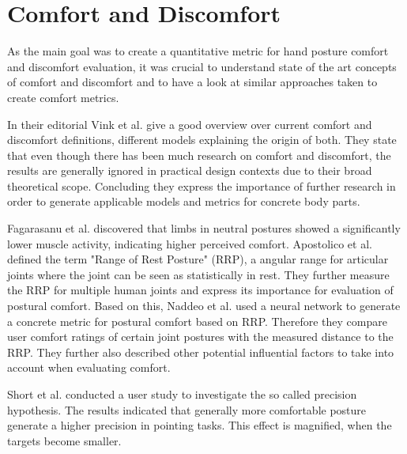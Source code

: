 \section{Comfort and Discomfort}

As the main goal was to create a quantitative metric for hand posture comfort and discomfort evaluation, it was crucial to understand state of the art concepts of comfort and discomfort and to have a look at similar approaches taken to create comfort metrics.

In their editorial Vink et al. \cite{vink2012editorial} give a good overview over current comfort and discomfort definitions, different models explaining the origin of both. They state that even though there has been much research on comfort and discomfort, the results are generally ignored in practical design contexts due to their broad theoretical scope. Concluding they express the importance of further research in order to generate applicable models and metrics for concrete body parts.

Fagarasanu et al. \cite{fagarasanu2004measurement} discovered that limbs in neutral postures showed a significantly lower muscle activity, indicating higher perceived comfort. Apostolico et al. \cite{apostolico2014postural} defined the term "Range of Rest Posture" (RRP), a angular range for articular joints where the joint can be seen as statistically in rest. They further measure the RRP for multiple human joints and express its importance for evaluation of postural comfort. Based on this, Naddeo et al. \cite{naddeo2015proposal} used a neural network to generate a concrete metric for postural comfort based on RRP. Therefore they compare user comfort ratings of certain joint postures with the measured distance to the RRP. They further also described other potential influential factors to take into account when evaluating comfort.

Short et al. \cite{short1999precision} conducted a user study to investigate the so called precision hypothesis. The results indicated that generally more comfortable posture generate a higher precision in pointing tasks. This effect is magnified, when the targets become smaller.